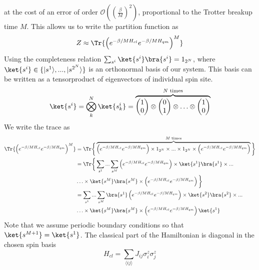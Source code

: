 at the cost of an error of order $\mathcal{O}\left((\frac{\beta}{M})^2\right)$, proportional to the Trotter breakup time $M$. This allows us to write the partition function as
\begin{equation*}
Z \approx \Tr{\left(e^{-\beta/M H_{cl}}e^{-\beta/M H_{qm}}\right)^M}
\end{equation*}
Using the completeness relation $\sum_{s^i} \ket{s^i}\bra{s^i} = 1_{2^N}$, where $\ket{s^i} \in \{|s^1\rangle,...,|s^{2^N}\rangle\}$ is an orthonormal basis of our system. This basis can be written as a tensorproduct of eigenvectors of individual spin site.
\begin{equation*}
    \ket{s^i} = \bigotimes_k^N \ket{s^i_k} = \overbrace{
    \begin{pmatrix}
    1 \\
    0
    \end{pmatrix}
    \otimes
    \begin{pmatrix}
    0 \\
    1
    \end{pmatrix}
    \otimes\ldots \otimes
    \begin{pmatrix}
    1 \\
    0
    \end{pmatrix}}^{N \text{ times}}
\end{equation*}
We write the trace as
\begin{align*}
\Tr{\left(e^{-\beta/M H_{cl}}e^{-\beta/M H_{qm}}\right)^M}  &= \Tr\bigg\{\overbrace{\left(e^{-\beta/M H_{cl}}e^{-\beta/M H_{qm}}\right) \times 1_{2^N}  \times ... \times 1_{2^N} \times \left(e^{-\beta/M H_{cl}}e^{-\beta/M H_{qm}}\right) }^{\text{$M$ times}}\bigg\}\\
 &=\Tr\bigg\{\sum_{s^1}...\sum_{s^M} \left(e^{-\beta/M H_{cl}}e^{-\beta/M H_{qm}}\right)  \times \ket{s^1}\bra{s^1}  \times...\\
 & \ldots \times\ket{s^M}\bra{s^M} \times  \left(e^{-\beta/M H_{cl}}e^{-\beta/M H_{qm}}\right) \bigg\}\\
 &=\sum_{s^1}...\sum_{s^M} \bra{s^1}\left(e^{-\beta/M H_{cl}}e^{-\beta/M H_{qm}}\right) \times \ket{s^2}\bra{s^2}  \times... \\ 
 & \ldots\times\ket{s^M}\bra{s^M} \times  \left(e^{-\beta/M H_{cl}}e^{-\beta/M H_{qm}}\right)\ket{s^1}\\
\end{align*}
Note that we assume periodic boundary conditions so that $\ket{s^{M+1}}=\ket{s^1}$. The classical part of the Hamiltonian is diagonal in the chosen spin basis
\begin{equation*}
    H_{cl} = \sum_{\langle ij \rangle} J_{ij} \sigma^z_i \sigma^z_j
\end{equation*}
